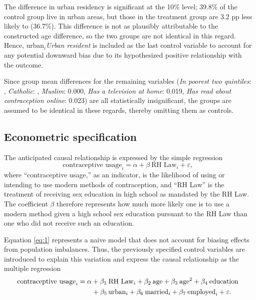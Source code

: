 \documentclass[12pt]{article}
\newcommand{\age}{%
    \ifmmode\ensuremath{\text{age}}\else\textit{Age}\fi
}
\newcommand{\educ}{%
    \ifmmode\ensuremath{\textrm{education}}\else\textit{Years of education}\fi
}
\newcommand{\urban}{%
    \ifmmode\ensuremath{\textrm{urban}_i}\else\textit{Urban resident}\fi
}
\newcommand{\poorest}{\textit{In poorest two quintiles}}
\newcommand{\married}{%
    \ifmmode\ensuremath{\textrm{married}_i}\else\textit{Married}\fi
}
\newcommand{\employed}{%
    \ifmmode\ensuremath{\textrm{employed}_i}\else\textit{Employed}\fi
}
\newcommand{\catholic}{\textit{Catholic}}
\newcommand{\muslim}{\textit{Muslim}}
\newcommand{\television}{\textit{Has a television at home}}
\newcommand{\readonline}{\textit{Has read about contraception online}}
\newcommand{\outcome}{\ensuremath{\textrm{contraceptive usage}_i}}
\newcommand{\treatment}{\ensuremath{\textrm{RH Law}_i}}
\begin{document}
    The difference in urban residency is significant at the 10\% level; 39.8\% of the control group live in urban areas, but those in the treatment group are 3.2 pp less likely to (36.7\%).
    This difference is not as plausibly attributable to the constructed age difference, so the two groups are not identical in this regard. Hence, \urban{} is included as the last control variable to account for any potential downward bias due to its hypothesized
    positive relationship with the outcome.

    Since group mean differences for the remaining variables (\poorest{}: , \catholic{}: , \muslim{}: 0.000, \television{}: 0.019, \readonline{}: 0.023) are all statistically insignificant, the groups are assumed to be identical in these regards, thereby omitting them as controls.


    \subsection{Econometric specification} \label{econometric-specification}
    The anticipated causal relationship is expressed by the simple regression
    \begin{equation}
        \label{eq:1}
        \outcome = \alpha + \beta \: \treatment + \varepsilon,
    \end{equation}
    where ``contraceptive usage,'' as an indicator, is the likelihood of using or intending to use modern methods of contraception, and ``RH Law'' is the treatment of receiving sex education in high school as mandated by the RH Law.
    The coefficient $\beta$ therefore represents how much more likely one is to use a modern method given a high school sex education pursuant to the RH Law than one who did not receive such an education.

    Equation \ref{eq:1} represents a naive model that does not account for biasing effects from population imbalances.
    Thus, the previously specified control variables are introduced to explain this variation and express the causal relationship as the multiple regression
    \begin{align}
    \begin{split}
        \label{eq:2}
            \outcome &= \alpha + \beta_1 \: \treatment + \beta_2 \: \age + \beta_3 \: \age^2 + \beta_4 \: \educ \\
            &\qquad + \beta_5 \, \urban + \beta_6 \: \married + \beta_7 \: \employed + \varepsilon.
    \end{split}
    \end{align}
\end{document}
